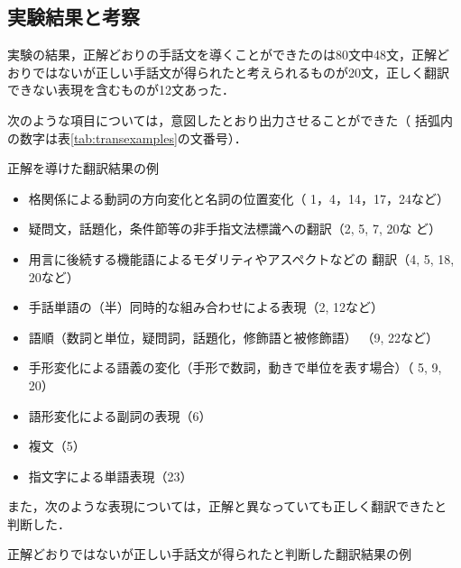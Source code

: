 \documentclass[japanese]{jnlp_1.4}
\newcounter{example}
\begin{document}
\subsection{実験結果と考察}

実験の結果，正解どおりの手話文を導くことができたのは80文中48文，正解ど
おりではないが正しい手話文が得られたと考えられるものが20文，正しく翻訳
できない表現を含むものが12文あった．

次のような項目については，意図したとおり出力させることができた（
括弧内の数字は表\ref{tab:transexamples}の文番号）．

\begin{table}[t]
    \caption{正解を導けた翻訳結果の例
      \label{tab:transexamples}}

\end{table}

\begin{itemize}
\item 格関係による動詞の方向変化と名詞の位置変化（
  1，4，14，17，24など）
\item 疑問文，話題化，条件節等の非手指文法標識への翻訳（2, 5, 7, 20な
  ど）
\item 用言に後続する機能語によるモダリティやアスペクトなどの
  翻訳（4, 5, 18, 20など）
\item 手話単語の（半）同時的な組み合わせによる表現（2, 12など）
\item 語順（数詞と単位，疑問詞，話題化，修飾語と被修飾語）
  （9, 22など）
\item 手形変化による語義の変化（手形で数詞，動きで単位を表す場合）（
   5, 9, 20）
\item 語形変化による副詞の表現（6）
\item 複文（5）
\item 指文字による単語表現（23）
\end{itemize}

また，次のような表現については，正解と異なっていても正しく翻訳できたと
判断した．

\setcounter{example}{0}
\begin{table}[t]
  \caption{正解どおりではないが正しい手話文が得られたと判断した翻訳結果の例}
  \label{tab:transexamples2}

\end{table}
\end{document}
